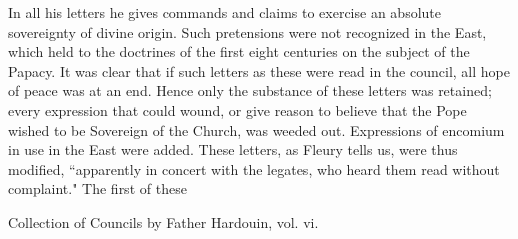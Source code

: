 In all his letters he gives commands and claims to exercise an absolute sovereignty of divine origin. Such pretensions were not recognized in the East, which held to the doctrines of the first eight centuries on the subject of the Papacy. It was clear that if such letters as these were read in the council, all hope of peace was at an end. Hence only the substance of these letters was retained; every expression that could wound, or give reason to believe that the Pope wished to be Sovereign of the Church, was weeded out. Expressions of encomium in use in the East were added. These letters, as Fleury tells us, were thus modified, “apparently in concert with the legates, who heard them read without complaint." The first of these

Collection of Councils by Father Hardouin, vol. vi.


